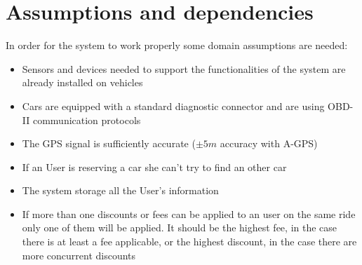 \section{Assumptions and dependencies}
In order for the system to work properly some domain assumptions are needed:
\begin{itemize}
	\item{Sensors and devices needed to support the functionalities of the system are already installed on vehicles}
	\item{Cars are equipped with a standard diagnostic connector and are using OBD-II communication protocols}
	\item{The GPS signal is sufficiently accurate ($\pm5m$ accuracy with A-GPS)}
	\item{If an User is reserving a car she can't try to find an other car}
	\item{The system storage all the User's information}
	\item{If more than one discounts or fees can be applied to an user on the same ride only one of them will be applied. It should be the highest fee, in the case there is at least a fee applicable, or the highest discount, in the case there are more concurrent discounts}
\end{itemize}
